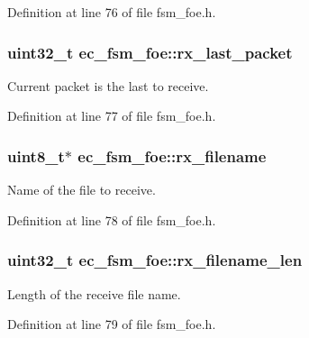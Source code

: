Definition at line 76 of file fsm\-\_\-foe.\-h.

\subsubsection[{rx\-\_\-last\-\_\-packet}]{\setlength{\rightskip}{0pt plus 5cm}uint32\-\_\-t ec\-\_\-fsm\-\_\-foe\-::rx\-\_\-last\-\_\-packet}\label{structec__fsm__foe_a1851f47e360be36fa979e219f36da5d0}


Current packet is the last to receive. 



Definition at line 77 of file fsm\-\_\-foe.\-h.

\subsubsection[{rx\-\_\-filename}]{\setlength{\rightskip}{0pt plus 5cm}uint8\-\_\-t$\ast$ ec\-\_\-fsm\-\_\-foe\-::rx\-\_\-filename}\label{structec__fsm__foe_af0315313d092bab948ce47c2114dc870}


Name of the file to receive. 



Definition at line 78 of file fsm\-\_\-foe.\-h.

\subsubsection[{rx\-\_\-filename\-\_\-len}]{\setlength{\rightskip}{0pt plus 5cm}uint32\-\_\-t ec\-\_\-fsm\-\_\-foe\-::rx\-\_\-filename\-\_\-len}\label{structec__fsm__foe_ab355fc6657db6b9c8c63fee2ec3a4e91}


Length of the receive file name. 



Definition at line 79 of file fsm\-\_\-foe.\-h.

